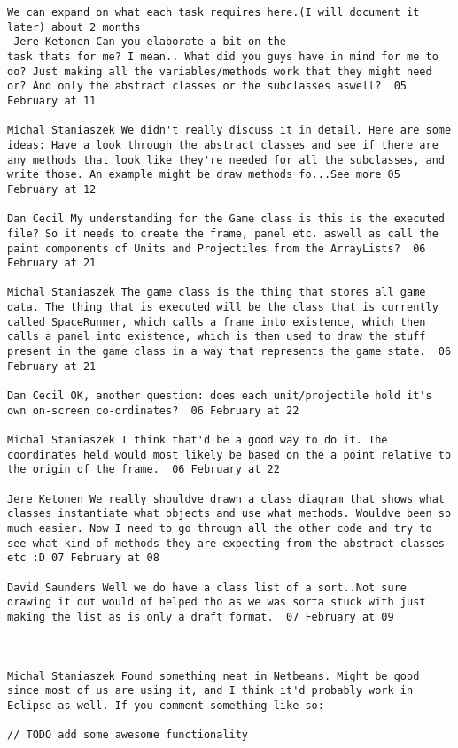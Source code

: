 \begin{verbatim}
We can expand on what each task requires here.(I will document it
later) about 2 months 
 Jere Ketonen Can you elaborate a bit on the
task thats for me? I mean.. What did you guys have in mind for me to
do? Just making all the variables/methods work that they might need
or? And only the abstract classes or the subclasses aswell?  05
February at 11

Michal Staniaszek We didn't really discuss it in detail. Here are some
ideas: Have a look through the abstract classes and see if there are
any methods that look like they're needed for all the subclasses, and
write those. An example might be draw methods fo...See more 05
February at 12

Dan Cecil My understanding for the Game class is this is the executed
file? So it needs to create the frame, panel etc. aswell as call the
paint components of Units and Projectiles from the ArrayLists?  06
February at 21

Michal Staniaszek The game class is the thing that stores all game
data. The thing that is executed will be the class that is currently
called SpaceRunner, which calls a frame into existence, which then
calls a panel into existence, which is then used to draw the stuff
present in the game class in a way that represents the game state.  06
February at 21

Dan Cecil OK, another question: does each unit/projectile hold it's
own on-screen co-ordinates?  06 February at 22

Michal Staniaszek I think that'd be a good way to do it. The
coordinates held would most likely be based on the a point relative to
the origin of the frame.  06 February at 22

Jere Ketonen We really shouldve drawn a class diagram that shows what
classes instantiate what objects and use what methods. Wouldve been so
much easier. Now I need to go through all the other code and try to
see what kind of methods they are expecting from the abstract classes
etc :D 07 February at 08

David Saunders Well we do have a class list of a sort..Not sure
drawing it out would of helped tho as we was sorta stuck with just
making the list as is only a draft format.  07 February at 09



Michal Staniaszek Found something neat in Netbeans. Might be good
since most of us are using it, and I think it'd probably work in
Eclipse as well. If you comment something like so:

// TODO add some awesome functionality


\end{verbatim}
